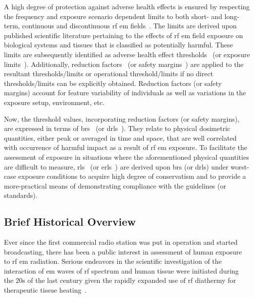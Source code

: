 A high degree of protection against adverse health effects is ensured by respecting the frequency and exposure scenario dependent limits to both short- and long-term, continuous and discontinuous \gls{rf} \gls{em} fields~\cite{ICNIRP2020Guidelines,IEEE2019Standard}.
The limits are derived upon published scientific literature pertaining to the effects of \gls{rf} \gls{em} field exposure on biological systems and tissues that is classified as potentially harmful.
These limits are subsequently identified as adverse health effect thresholds~\cite{ICNIRP2020Guidelines} (or exposure limits~\cite{IEEE2019Standard}).
Additionally, reduction factors~\cite{ICNIRP2020Guidelines} (or safety margins~\cite{IEEE2019Standard}) are applied to the resultant thresholds/limits or operational threshold/limits if no direct thresholds/limits can be explicitly obtained.
Reduction factors (or safety margins) account for feature variability of individuals as well as variations in the exposure setup, environment, etc.

Now, the threshold values, incorporating reduction factors (or safety margins), are expressed in terms of \gls{br}s~\cite{ICNIRP2020Guidelines} (or \gls{drl}s~\cite{IEEE2019Standard}).
They relate to physical dosimetric quantities, either peak or averaged in time and space, that are well correlated with occurrence of harmful impact as a result of \gls{rf} \gls{em} exposure.
To facilitate the assessment of exposure in situations where the aforementioned physical quantities are difficult to measure, \gls{rl}s~\cite{ICNIRP2020Guidelines} (or \gls{erl}s~\cite{IEEE2019Standard}) are derived upon \gls{br}s (or \gls{drl}s) under worst-case exposure conditions to acquire high degree of conservatism and to provide a more-practical means of demonstrating compliance with the guidelines (or standards).

\subsection{Brief Historical Overview}
Ever since the first commercial radio station was put in operation and started broadcasting, there has been a public interest in assessment of human exposure to \gls{rf} \gls{em} radiation.
Serious endeavors in the scientific investigation of the interaction of \gls{em} waves of \gls{rf} spectrum and human tissue were initiated during the 20s of the last century given the rapidly expanded use of \gls{rf} diathermy for therapeutic tissue heating~\cite{Kovacs1945Electrotherapy}.

